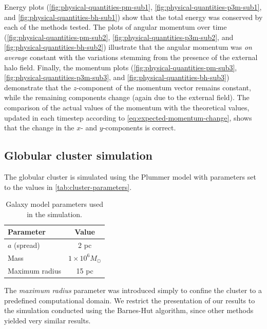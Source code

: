 Energy plots (\autoref{fig:physical-quantities-pm-sub1}, \autoref{fig:physical-quantities-p3m-sub1}, and \autoref{fig:physical-quantities-bh-sub1}) show that the total energy was conserved by each of the methods tested.
The plots of angular momentum over time (\autoref{fig:physical-quantities-pm-sub2}, \autoref{fig:physical-quantities-p3m-sub2}, and \autoref{fig:physical-quantities-bh-sub2}) illustrate that the angular momentum was \textit{on average} constant with the variations stemming from the presence of the external halo field.
Finally, the momentum plots (\autoref{fig:physical-quantities-pm-sub3}, \autoref{fig:physical-quantities-p3m-sub3}, and \autoref{fig:physical-quantities-bh-sub3}) demonstrate that the $z$-component of the momentum vector remains constant, while the remaining components change (again due to the external field).
The comparison of the actual values of the momentum with the theoretical values, updated in each timestep according to \autoref{eq:expected-momentum-change}, shows that the change in the $x$- and $y$-components is correct.


\subsection{Globular cluster simulation}
The globular cluster is simulated using the Plummer model with parameters set to the values in \autoref{tab:cluster-parameters}.
\begin{table}[htp]
    \centering
    \begin{tabular}{|l|c|}
        \hline
        \textbf{Parameter} & \textbf{Value}          \\
        \hline
        $a$ (spread)       & 2 pc                    \\
        Mass               & $1 \times 10^6 M_\odot$ \\
        Maximum radius     & 15 pc                   \\
        \hline
    \end{tabular}
    \caption{Galaxy model parameters used in the simulation.}
    \label{tab:cluster-parameters}
\end{table}
The \textit{maximum radius} parameter was introduced simply to confine the cluster to a predefined computational domain.
We restrict the presentation of our results to the simulation conducted using the Barnes-Hut algorithm, since other methods yielded very similar results.

